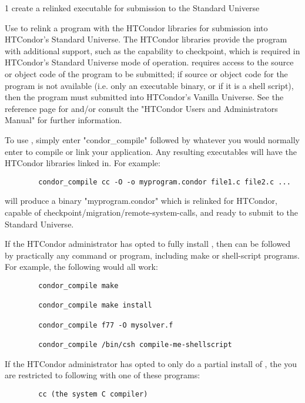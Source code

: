 \begin{ManPage}{\label{man-condor-compile}}{1}
{create a relinked executable for submission to the Standard Universe}

\Synopsis {}

\Description


Use  to relink a program with the HTCondor libraries for
submission into HTCondor's Standard Universe.
The HTCondor libraries provide the program with additional support, such
as the capability to checkpoint, which is required in HTCondor's
Standard Universe mode of operation.
 requires access to the source or object code of the
program to be submitted; if source or object code for the program is
not available (i.e. only an executable binary, or if it is a shell
script), then the program must submitted into HTCondor's Vanilla
Universe.
See the reference page for  and/or consult the "HTCondor
Users and Administrators Manual" for further information.

To use , simply enter "condor\_compile" followed by
whatever you would normally enter to compile or link your
application.
Any resulting executables will have the HTCondor libraries linked in.
For example: 
\begin{verbatim}
        condor_compile cc -O -o myprogram.condor file1.c file2.c ... 
\end{verbatim}
will produce a binary "myprogram.condor" which is relinked for HTCondor,
capable of checkpoint/migration/remote-system-calls, and ready to
submit to the Standard Universe.  

If the HTCondor administrator has opted to fully install
, then  can be followed by practically
any command or program, including make or shell-script programs.
For example, the following would all work:
\begin{verbatim}
        condor_compile make 

        condor_compile make install 

        condor_compile f77 -O mysolver.f 

        condor_compile /bin/csh compile-me-shellscript 
\end{verbatim}

If the HTCondor administrator has opted to only do a partial install of
, the you are restricted to following 
with one of these programs:  
\begin{verbatim}
        cc (the system C compiler) 


\end{verbatim}
\end{ManPage}

